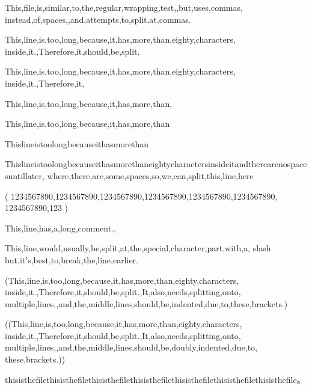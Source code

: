 \documentclass{article}
\begin{document}
This,file,is,similar,to,the,regular,wrapping,test,,but,uses,commas,
instead,of,spaces,,and,attempts,to,split,at,commas.

This,line,is,too,long,because,it,has,more,than,eighty,characters,
inside,it.,Therefore,it,should,be,split.

This,line,is,too,long,because,it,has,more,than,eighty,characters,
inside,it.,Therefore,it,%

This,line,is,too,long,because,it,has,more,than,%

This,line,is,too,long,because,it,has,more,than%

Thislineistoolongbecauseithasmorethan%

Thislineistoolongbecauseithasmorethaneightycharactersinsideitandtherearenospacesuntillater,
where,there,are,some,spaces,so,we,can,split,this,line,here

(
  1234567890,1234567890,1234567890,1234567890,1234567890,1234567890,
  1234567890,123
)

This,line,has,a,long,comment.,%


This,line,would,usually,be,split,at,the,special,character,part,with,a,
slash\,but,it's,best,to,break,the,line,earlier.

(This,line,is,too,long,because,it,has,more,than,eighty,characters,
  inside,it.,Therefore,it,should,be,split.,It,also,needs,splitting,onto,
multiple,lines,,and,the,middle,lines,should,be,indented,due,to,these,brackets.)

((This,line,is,too,long,because,it,has,more,than,eighty,characters,
    inside,it.,Therefore,it,should,be,split.,It,also,needs,splitting,onto,
    multiple,lines,,and,the,middle,lines,should,be,doubly,indented,due,to,
these,brackets.))

thisisthefilethisisthefilethisisthefilethisisthefilethisisthefilethisisthefilethisisthefile。
\end{document}
